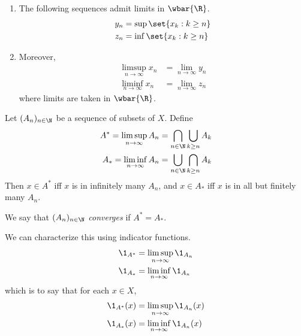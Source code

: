 \begin{theorem*}
    \leavevmode
    \begin{enumerate}[label=(\arabic*)]
        \item The following sequences admit limits in $\wbar{\R}$.
        \begin{align*}
            y_n &= \sup\set{x_k : k \ge n} \\
            z_n &= \inf\set{x_k : k \ge n}
        \end{align*}
        \item Moreover, \begin{align*}
            \limsup_{n \to \infty} x_n &= \lim_{n \to \infty} y_n \\
            \liminf_{n \to \infty} x_n &= \lim_{n \to \infty} z_n
        \end{align*} where limits are taken in $\wbar{\R}$.
    \end{enumerate}
\end{theorem*}
\begin{remark}
    Let $(A_n)_{n \in \N}$ be a sequence of subsets of $X$.
    Define \begin{align*}
        A^* = \limsup_{n \to \infty} A_n
            &= \bigcap_{n \in \N} \bigcup_{k \ge n} A_k \\
        A_* = \liminf_{n \to \infty} A_n
            &= \bigcup_{n \in \N} \bigcap_{k \ge n} A_k
    \end{align*}
    Then $x \in A^*$ iff $x$ is in infinitely many $A_n$,
    and $x \in A_*$ iff $x$ is in all but finitely many $A_n$.

    We say that $(A_n)_{n \in \N}$ \emph{converges} if $A^* = A_*$.

    We can characterize this using indicator functions.
    \begin{align*}
        \1_{A^*} &= \limsup_{n \to \infty} \1_{A_n} \\
        \1_{A_*} &= \liminf_{n \to \infty} \1_{A_n}
    \end{align*}
    which is to say that for each $x \in X$, \begin{align*}
        \1_{A^*}(x) &= \limsup_{n \to \infty} \1_{A_n}(x) \\
        \1_{A_*}(x) &= \liminf_{n \to \infty} \1_{A_n}(x)
    \end{align*}
\end{remark}
